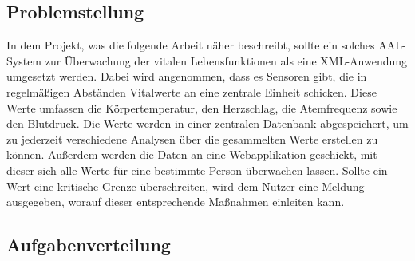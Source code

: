 \subsection{Problemstellung}
In dem Projekt, was die folgende Arbeit näher beschreibt, sollte ein solches AAL-System zur Überwachung der vitalen Lebensfunktionen als eine XML-Anwendung umgesetzt werden. Dabei wird angenommen, dass es Sensoren gibt, die in regelmäßigen Abständen Vitalwerte an eine zentrale Einheit schicken. Diese Werte umfassen die Körpertemperatur, den Herzschlag, die Atemfrequenz sowie den Blutdruck. Die Werte werden in einer zentralen Datenbank abgespeichert, um zu jederzeit verschiedene Analysen über die gesammelten Werte erstellen zu können. Außerdem werden die Daten an eine Webapplikation geschickt, mit dieser sich alle Werte für eine bestimmte Person überwachen lassen. Sollte ein Wert eine kritische Grenze überschreiten, wird dem Nutzer eine Meldung ausgegeben, worauf dieser entsprechende Maßnahmen einleiten kann.

\subsection{Aufgabenverteilung}